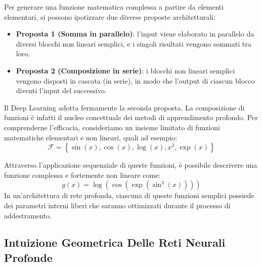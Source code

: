 ﻿\documentclass[11pt, a4paper]{article}
\begin{document}
Per generare una funzione matematica complessa a partire da elementi elementari, si possono ipotizzare due diverse proposte architetturali:


\begin{itemize}
    \item \textbf{Proposta 1 (Somma in parallelo)}: l'input viene elaborato in parallelo da diversi blocchi non lineari semplici, e i singoli risultati vengono sommati tra loro.
    \item \textbf{Proposta 2 (Composizione in serie)}: i blocchi non lineari semplici vengono disposti in cascata (in serie), in modo che l'output di ciascun blocco diventi l'input del successivo.
\end{itemize}

Il Deep Learning adotta fermamente la seconda proposta. La composizione di funzioni è infatti il nucleo concettuale dei metodi di apprendimento profondo. Per comprenderne l'efficacia, consideriamo un insieme limitato di funzioni matematiche elementari e non lineari, quali ad esempio:
\[ \mathcal{F} = \left\{ \sin(x), \cos(x), \log(x), x^3, \exp(x) \right\} \]


Attraverso l'applicazione sequenziale di queste funzioni, è possibile descrivere una funzione complessa e fortemente non lineare come:
\[ g(x) = \log\left(\cos\left(\exp\left(\sin^3(x)\right)\right)\right) \]
In un'architettura di rete profonda, ciascuna di queste funzioni semplici possiede dei parametri interni liberi che saranno ottimizzati durante il processo di addestramento.

\subsection{Intuizione Geometrica Delle Reti Neurali Profonde}

\end{document}
